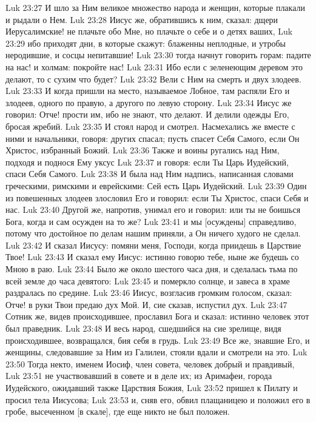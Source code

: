 Luk 23:27  И шло за Ним великое множество народа и женщин, которые плакали и рыдали о Нем.
Luk 23:28  Иисус же, обратившись к ним, сказал: дщери Иерусалимские! не плачьте обо Мне, но плачьте о себе и о детях ваших,
Luk 23:29  ибо приходят дни, в которые скажут: блаженны неплодные, и утробы неродившие, и сосцы непитавшие!
Luk 23:30  тогда начнут говорить горам: падите на нас! и холмам: покройте нас!
Luk 23:31  Ибо если с зеленеющим деревом это делают, то с сухим что будет?
Luk 23:32  Вели с Ним на смерть и двух злодеев.
Luk 23:33  И когда пришли на место, называемое Лобное, там распяли Его и злодеев, одного по правую, а другого по левую сторону.
Luk 23:34  Иисус же говорил: Отче! прости им, ибо не знают, что делают. И делили одежды Его, бросая жребий.
Luk 23:35  И стоял народ и смотрел. Насмехались же вместе с ними и начальники, говоря: других спасал; пусть спасет Себя Самого, если Он Христос, избранный Божий.
Luk 23:36  Также и воины ругались над Ним, подходя и поднося Ему уксус
Luk 23:37  и говоря: если Ты Царь Иудейский, спаси Себя Самого.
Luk 23:38  И была над Ним надпись, написанная словами греческими, римскими и еврейскими: Сей есть Царь Иудейский.
Luk 23:39  Один из повешенных злодеев злословил Его и говорил: если Ты Христос, спаси Себя и нас.
Luk 23:40  Другой же, напротив, унимал его и говорил: или ты не боишься Бога, когда и сам осужден на то же?
Luk 23:41  и мы [осуждены] справедливо, потому что достойное по делам нашим приняли, а Он ничего худого не сделал.
Luk 23:42  И сказал Иисусу: помяни меня, Господи, когда приидешь в Царствие Твое!
Luk 23:43  И сказал ему Иисус: истинно говорю тебе, ныне же будешь со Мною в раю.
Luk 23:44  Было же около шестого часа дня, и сделалась тьма по всей земле до часа девятого:
Luk 23:45  и померкло солнце, и завеса в храме раздралась по средине.
Luk 23:46  Иисус, возгласив громким голосом, сказал: Отче! в руки Твои предаю дух Мой. И, сие сказав, испустил дух.
Luk 23:47  Сотник же, видев происходившее, прославил Бога и сказал: истинно человек этот был праведник.
Luk 23:48  И весь народ, сшедшийся на сие зрелище, видя происходившее, возвращался, бия себя в грудь.
Luk 23:49  Все же, знавшие Его, и женщины, следовавшие за Ним из Галилеи, стояли вдали и смотрели на это.
Luk 23:50  Тогда некто, именем Иосиф, член совета, человек добрый и правдивый,
Luk 23:51  не участвовавший в совете и в деле их; из Аримафеи, города Иудейского, ожидавший также Царствия Божия,
Luk 23:52  пришел к Пилату и просил тела Иисусова;
Luk 23:53  и, сняв его, обвил плащаницею и положил его в гробе, высеченном [в скале], где еще никто не был положен.
